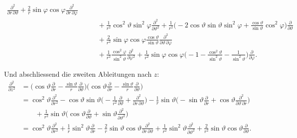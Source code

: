 \begin{align*}
\frac{\partial^2}{\partial r\,\partial\vartheta}
+
\frac2r
\sin\varphi\cos\varphi
\frac{\partial^2}{\partial r\,\partial\varphi}
\\
&\qquad
+
\frac1{r^2}\cos^2\vartheta\sin^2\varphi
\frac{\partial^2}{\partial\vartheta^2}
+
\frac1{r^2}
\biggl(
-2\cos\vartheta\sin\vartheta\sin^2\varphi
+\frac{\cos\vartheta}{\sin\vartheta}\cos^2\varphi
\biggr)
\frac{\partial}{\partial\vartheta}
\\
&\qquad
+
\frac2{r^2}\sin\varphi\cos\varphi\frac{\cos\vartheta}{\sin\vartheta}
\frac{\partial^2}{\partial\vartheta\,\partial\varphi}
\\
&\qquad
+
\frac1{r^2}\frac{\cos^2\varphi}{\sin^2\vartheta}
\frac{\partial^2}{\partial\varphi^2}
+
\frac1{r^2}
\sin\varphi\cos\varphi
\biggl(
-1
-
\frac{\cos^2\vartheta}{\sin^2\vartheta}
-\frac1{\sin^2\vartheta}
\biggr)
\frac{\partial}{\partial\varphi}.
\end{align*}

Und abschliessend die zweiten Ableitungen nach $z$:
\begin{align*}
\frac{\partial^2}{\partial z^2}
&=
\biggl(
\cos\vartheta
\frac{\partial}{\partial r}
-
\frac{\sin\vartheta}{r}
\frac{\partial}{\partial\vartheta}
\biggr)
\biggl(
\cos\vartheta
\frac{\partial}{\partial r}
-
\frac{\sin\vartheta}{r}
\frac{\partial}{\partial\vartheta}
\biggr)
\\
&=
\cos^2\vartheta\frac{\partial^2}{\partial r^2}
-
\cos\vartheta \sin\vartheta\biggl(
-\frac1{r^2}\frac{\partial}{\partial\vartheta}
+\frac{\partial^2}{\partial r\,\partial\vartheta}
\biggr)
-
\frac1r\sin\vartheta\biggl(
-\sin\vartheta\frac{\partial}{\partial r}
+\cos\vartheta\frac{\partial^2}{\partial\vartheta\,\partial r}
\biggr)
\\
&\qquad
+
\frac1{r^2}\sin\vartheta\biggl(
\cos\vartheta\frac{\partial}{\partial\vartheta}
+\sin\vartheta\frac{\partial^2}{\partial\vartheta^2}
\biggr)
\\
&=\cos^2\vartheta\frac{\partial^2}{\partial r^2}
+
\frac1r\sin^2\vartheta\frac{\partial}{\partial r}
-
\frac2{r}\sin\vartheta\cos\vartheta
\frac{\partial^2}{\partial r\,\partial\vartheta}
+
\frac1{r^2}\sin^2\vartheta \frac{\partial^2}{\partial\vartheta^2}
+
\frac2{r^2}\sin\vartheta\cos\vartheta \frac{\partial}{\partial\vartheta}.
\end{align*}

